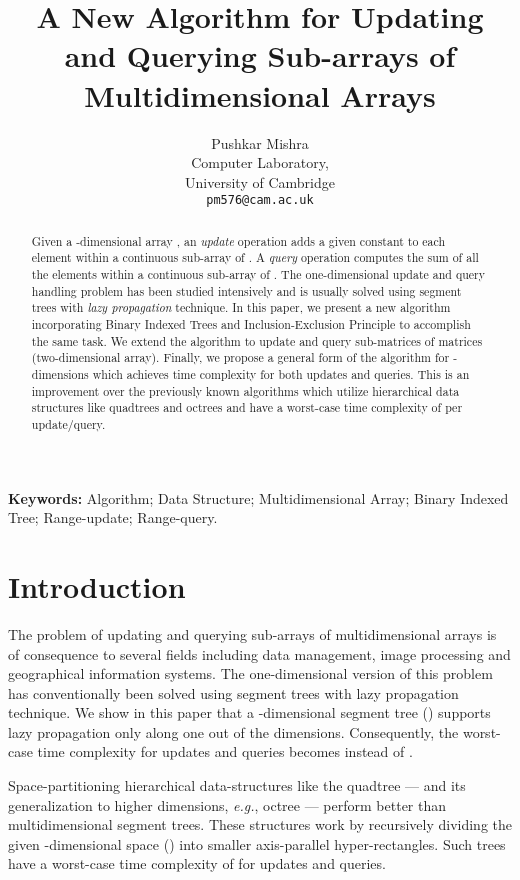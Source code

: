 \documentclass[a4paper]{article}
\title{\textbf{A New Algorithm for Updating and Querying Sub-arrays of Multidimensional Arrays}}
\author{Pushkar Mishra\\
Computer Laboratory,\\
University of Cambridge\\
\texttt{pm576@cam.ac.uk}}
\date{\vspace{-7 mm}}
\begin{document}
\maketitle
\begin{abstract}
Given a -dimensional array , an \textit{update} operation adds a given constant  to each element within a continuous sub-array of . A \textit{query} operation computes the sum of all the elements within a continuous sub-array of . The one-dimensional update and query handling problem has been studied intensively and is usually solved using segment trees with \textit{lazy propagation} technique. In this paper, we present a new algorithm incorporating Binary Indexed Trees and Inclusion-Exclusion Principle to accomplish the same task. We extend the algorithm to update and query sub-matrices of matrices (two-dimensional array). Finally, we propose a general form of the algorithm for -dimensions which achieves  time complexity for both updates and queries. This is an improvement over the previously known algorithms which utilize hierarchical data structures like quadtrees and octrees and have a worst-case time complexity of  per update/query.
\end{abstract}

\smallskip
\noindent
\textbf{Keywords:} Algorithm; Data Structure; Multidimensional Array; Binary Indexed Tree; Range-update; Range-query.


\section{Introduction}
The problem of updating and querying sub-arrays of multidimensional arrays is of consequence to several fields including data management, image processing and geographical information systems. The one-dimensional version of this problem has conventionally been solved using segment trees with lazy propagation technique. We show in this paper that a -dimensional segment tree () supports lazy propagation only along one out of the  dimensions. Consequently, the worst-case time complexity for updates and queries becomes  instead of .

\vspace{2 mm}
Space-partitioning hierarchical data-structures like the quadtree --- and its generalization to higher dimensions, \textit{e.g.}, octree --- perform better than multidimensional segment trees.\cite{HS1} These structures work by recursively dividing the given -dimensional space () into smaller axis-parallel hyper-rectangles. Such trees have a worst-case time complexity of  for updates and queries.
\end{document}
